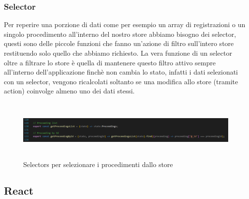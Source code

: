 \subsubsection{Selector}
Per reperire una porzione di dati come per esempio un array di registrazioni o un singolo procedimento all'interno del nostro store abbiamo bisogno dei selector, questi sono delle
piccole funzioni che fanno un'azione di filtro sull'intero store restituendo solo quello che abbiamo richiesto. La vera funzione di un selector oltre a filtrare lo store è quella di
mantenere questo filtro attivo sempre all'interno dell'applicazione finchè non cambia lo stato, infatti i dati selezionati con un selector, vengono ricalcolati soltanto se una
modifica allo store (tramite action) coinvolge almeno uno dei dati stessi.

\begin{figure}[H]
  \centering
  \includegraphics[width=\textwidth,height=3cm]{immagini/selectors.png}
  \caption{Selectors per selezionare i procedimenti dallo store}
\end{figure}

\subsection{React}

